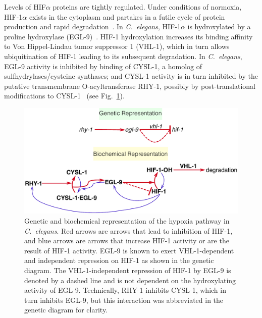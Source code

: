 \documentclass[9pt,twocolumn,twoside]{pnas-new}
\newcommand{\cel}{\emph{C.~elegans}}
\newcommand{\eglp}{EGL-9}
\newcommand{\rhyp}{RHY-1}
\newcommand{\vhlp}{VHL-1}
\newcommand{\hifp}{HIF-1}
\newcommand{\cyslp}{CYSL-1}
\begin{document}
Levels of HIF$\alpha$ proteins are tightly regulated. Under conditions of
normoxia, \hifp{}$\alpha$ exists in the cytoplasm and partakes in a futile cycle
of protein production and rapid degradation~\cite{Huang1996}. In \cel{},
\hifp{}$\alpha$ is hydroxylated by a proline hydroxylase
(\eglp{})~\cite{Kaelin2008}. \hifp{} hydroxylation increases its binding
affinity to Von Hippel-Lindau tumor suppressor 1 (\vhlp{}), which in turn allows
ubiquitination of \hifp{} leading to its subsequent degradation. In \cel{},
\eglp{} activity is inhibited by binding of \cyslp{}, a homolog of
sulfhydrylases/cysteine synthases; and \cyslp{} activity is in turn inhibited by
the putative transmembrane O-acyltransferase \rhyp{}, possibly by
post-translational modifications to \cyslp{}~\cite{Ma2012} (see
Fig.~\ref{fig:pathway}).

\begin{figure}[tbhp]
  \centering
  \includegraphics[width=\linewidth]{../figs/HIF1pathway.pdf}
  \caption{
    Genetic and biochemical representation of the hypoxia pathway in \cel{}. Red
    arrows are arrows that lead to inhibition of \hifp{}, and blue arrows are
    arrows that increase \hifp{} activity or are the result of \hifp{} activity.
    \eglp{} is known to exert \vhlp{}-dependent and independent repression
    on \hifp{} as shown in the genetic diagram. The \vhlp{}-independent
    repression of \hifp{} by \eglp{} is denoted by a dashed line and is not
    dependent on the hydroxylating activity of \eglp{}. Technically, RHY-1
    inhibits CYSL-1, which in turn inhibits EGL-9, but this interaction was
    abbreviated in the genetic diagram for clarity.
  }
\label{fig:pathway}
\end{figure}
\end{document}
